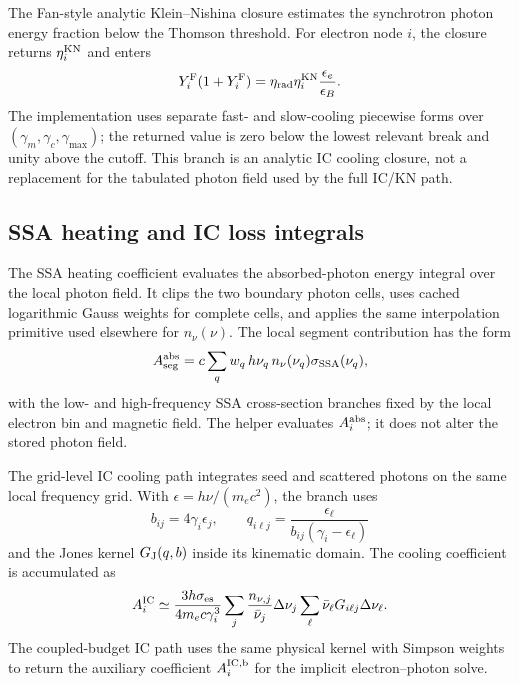 \documentclass[twocolumn]{aastex702}
\begin{document}
The Fan-style analytic Klein--Nishina closure estimates the synchrotron photon
energy fraction below the Thomson threshold.  For electron node \(i\), the
closure returns \(\eta_i^{\rm KN}\) and enters
\begin{equation}
Y_i^{\rm F}(1+Y_i^{\rm F})=
\eta_{\rm rad}\eta_i^{\rm KN}\frac{\epsilon_e}{\epsilon_B}.
\end{equation}
The implementation uses separate fast- and slow-cooling piecewise forms over
\((\gamma_m,\gamma_c,\gamma_{\max})\); the returned value is zero below the
lowest relevant break and unity above the cutoff.  This branch is an analytic IC
cooling closure, not a replacement for the tabulated photon field used by the
full IC/KN path.

\subsection{SSA heating and IC loss integrals}

The SSA heating coefficient evaluates the absorbed-photon energy integral over
the local photon field.  It clips the two boundary photon cells, uses cached
logarithmic Gauss weights for complete cells, and applies the same interpolation
primitive used elsewhere for \(n_\nu(\nu)\).  The local segment contribution has
the form
\begin{equation}
A_{\rm seg}^{\rm abs}
=c\sum_q w_q\,h\nu_q\,n_\nu(\nu_q)\sigma_{\rm SSA}(\nu_q),
\end{equation}
with the low- and high-frequency SSA cross-section branches fixed by the local
electron bin and magnetic field.  The helper evaluates \(A_i^{\rm abs}\); it does
not alter the stored photon field.

The grid-level IC cooling path integrates seed and scattered photons on the same
local frequency grid.  With \(\epsilon=h\nu/(m_ec^2)\), the branch uses
\begin{equation}
b_{ij}=4\gamma_i\epsilon_j,\qquad
q_{i\ell j}=\frac{\epsilon_\ell}{b_{ij}(\gamma_i-\epsilon_\ell)}
\end{equation}
and the Jones kernel \(G_{\rm J}(q,b)\) inside its kinematic domain.  The cooling
coefficient is accumulated as
\begin{equation}
A_i^{\rm IC}\simeq
\frac{3h\sigma_{\rm es}}{4m_e c\gamma_i^3}
\sum_j\frac{n_{\nu,j}}{\bar\nu_j}\Delta\nu_j
\sum_\ell \bar\nu_\ell G_{i\ell j}\Delta\nu_\ell .
\end{equation}
The coupled-budget IC path uses the same physical kernel with Simpson weights to
return the auxiliary coefficient \(A_i^{\rm IC,b}\) for the implicit
electron--photon solve.
\end{document}
